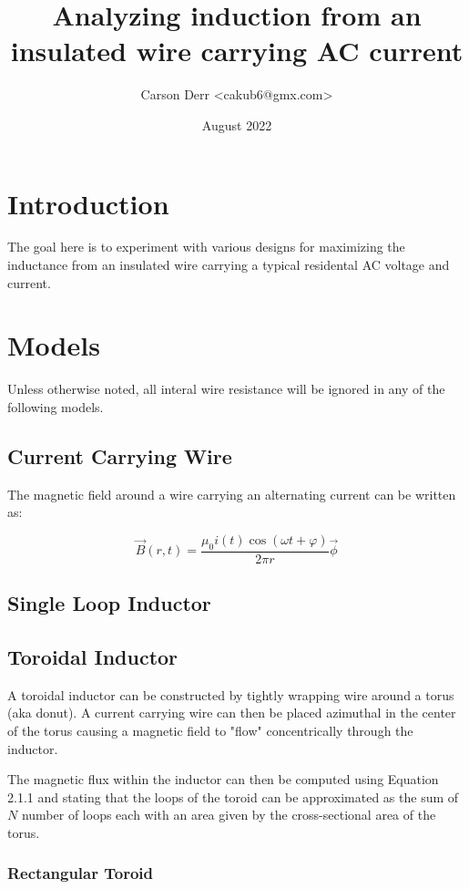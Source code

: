 \documentclass{article}
\title{Analyzing induction from an insulated wire carrying AC current}
\author{Carson Derr <cakub6@gmx.com>}
\date{August 2022}
\numberwithin{equation}{subsection}
\begin{document}
\maketitle

\section{Introduction}
The goal here is to experiment with various designs for maximizing the inductance
from an insulated wire carrying a typical residental AC voltage and current.

\section{Models}
Unless otherwise noted, all interal wire resistance will be ignored in any of the following models.

\subsection{Current Carrying Wire}

The magnetic field around a wire carrying an alternating current can be written as:

\begin{equation}
\vec{B}(r, t) = \frac{\mu_0 i(t) \cos(\omega t + \varphi)}{2 \pi r}\vec{\phi}
\end{equation}

\subsection{Single Loop Inductor}

\subsection{Toroidal Inductor}

A toroidal inductor can be constructed by tightly wrapping wire around a torus (aka donut). A current
carrying wire can then be placed azimuthal in the center of the torus causing a magnetic field to "flow"
concentrically through the inductor.

The magnetic flux within the inductor can then be computed using Equation 2.1.1 and stating
that the loops of the toroid can be approximated as the sum of \(N\) number of loops each with an area
given by the cross-sectional area of the torus.

\subsubsection{Rectangular Toroid}
\end{document}
